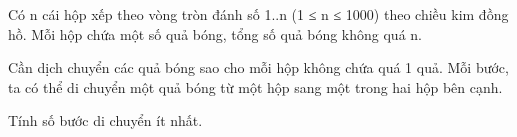Có n cái hộp xếp theo vòng tròn đánh số 1..n (1 ≤ n ≤ 1000) theo chiều kim đồng hồ. Mỗi hộp chứa một số quả bóng, tổng số quả bóng không quá n.  

   Cần dịch chuyển các quả bóng sao cho mỗi hộp không chứa quá 1 quả. Mỗi bước, ta có thể di chuyển một quả bóng từ một hộp sang một trong hai hộp bên cạnh.  

   Tính số bước di chuyển ít nhất.  

\